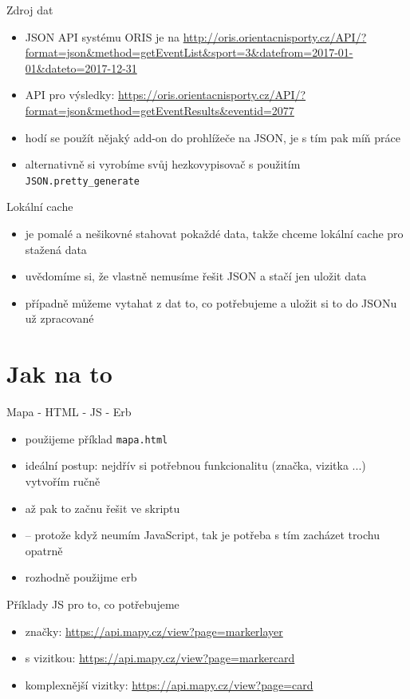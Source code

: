 \documentclass{beamer}
\begin{document}
\begin{frame}{Zdroj dat}
  \begin{itemize}
    \item JSON API systému ORIS je na \url{http://oris.orientacnisporty.cz/API/?format=json\&method=getEventList\&sport=3\&datefrom=2017-01-01\&dateto=2017-12-31}
    \item API pro výsledky: \url{https://oris.orientacnisporty.cz/API/?format=json&method=getEventResults&eventid=2077}
    \item hodí se použít nějaký add-on do prohlížeče na JSON, je s tím pak míň práce
    \item alternativně si vyrobíme svůj hezkovypisovač s použitím \texttt{JSON.pretty\_generate}
  \end{itemize}
\end{frame}

\begin{frame}{Lokální cache}
  \begin{itemize}
    \item je pomalé a nešikovné stahovat pokaždé data, takže chceme lokální cache pro stažená data
    \item uvědomíme si, že vlastně nemusíme řešit JSON a stačí jen uložit data
    \item případně můžeme vytahat z dat to, co potřebujeme a uložit si to do JSONu už zpracované
  \end{itemize}
\end{frame}

\section{Jak na to}

\begin{frame}{Mapa - HTML - JS - Erb}
  \begin{itemize}
    \item použijeme příklad \texttt{mapa.html}
    \item ideální postup: nejdřív si potřebnou funkcionalitu (značka, vizitka ...) vytvořím ručně
    \item až pak to začnu řešit ve skriptu
    \item -- protože když neumím JavaScript, tak je potřeba s tím zacházet trochu opatrně
    \item rozhodně použijme erb
  \end{itemize}
\end{frame}

\begin{frame}{Příklady JS pro to, co potřebujeme}
  \begin{itemize}
    \item značky: \url{https://api.mapy.cz/view?page=markerlayer}
    \item s vizitkou: \url{https://api.mapy.cz/view?page=markercard}
    \item komplexnější vizitky: \url{https://api.mapy.cz/view?page=card}
  \end{itemize}
\end{frame}
\end{document}
